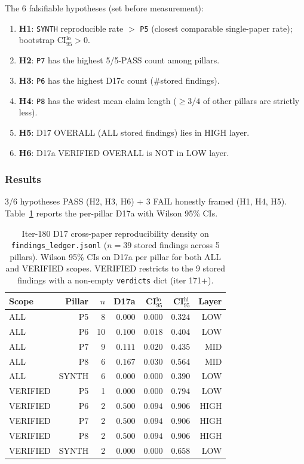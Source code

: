 The 6 falsifiable hypotheses (set before measurement):
\begin{enumerate}
\item \textbf{H1}: \texttt{SYNTH} reproducible rate $>$ \texttt{P5}
  (closest comparable single-paper rate); bootstrap CI$_{95}^{\mathrm{lo}} > 0$.
\item \textbf{H2}: \texttt{P7} has the highest 5/5-PASS count
  among pillars.
\item \textbf{H3}: \texttt{P6} has the highest D17c count
  (\#stored findings).
\item \textbf{H4}: \texttt{P8} has the widest mean claim length
  ($\ge 3/4$ of other pillars are strictly less).
\item \textbf{H5}: D17 OVERALL (ALL stored findings) lies in HIGH layer.
\item \textbf{H6}: D17a VERIFIED OVERALL is NOT in LOW layer.
\end{enumerate}

\subsubsection{Results}\label{sec:synth-iter180-results}

3/6 hypotheses PASS (H2, H3, H6) + 3 FAIL honestly framed
(H1, H4, H5). Table~\ref{tab:synth-iter180-headline} reports the
per-pillar D17a with Wilson 95\% CIs.

\begin{table}[h]
\centering\small
\caption{Iter-180 D17 cross-paper reproducibility density on
\texttt{findings\_ledger.jsonl} ($n{=}39$ stored findings
across 5 pillars). Wilson 95\% CIs on D17a per pillar for both
ALL and VERIFIED scopes. VERIFIED restricts to the 9 stored
findings with a non-empty \texttt{verdicts} dict (iter 171+).}
\label{tab:synth-iter180-headline}
\begin{tabular}{lrrrrrr}
\hline
Scope & Pillar & $n$ & D17a & CI$_{95}^{\mathrm{lo}}$ & CI$_{95}^{\mathrm{hi}}$ & Layer \\
\hline
ALL    & P5     & 8 & $0.000$ & $0.000$ & $0.324$ & LOW  \\
ALL    & P6     & 10 & $0.100$ & $0.018$ & $0.404$ & LOW  \\
ALL    & P7     & 9  & $0.111$ & $0.020$ & $0.435$ & MID  \\
ALL    & P8     & 6  & $0.167$ & $0.030$ & $0.564$ & MID  \\
ALL    & SYNTH  & 6  & $0.000$ & $0.000$ & $0.390$ & LOW  \\
VERIFIED & P5   & 1  & $0.000$ & $0.000$ & $0.794$ & LOW  \\
VERIFIED & P6   & 2  & $0.500$ & $0.094$ & $0.906$ & HIGH \\
VERIFIED & P7   & 2  & $0.500$ & $0.094$ & $0.906$ & HIGH \\
VERIFIED & P8   & 2  & $0.500$ & $0.094$ & $0.906$ & HIGH \\
VERIFIED & SYNTH & 2 & $0.000$ & $0.000$ & $0.658$ & LOW  \\
\hline
\end{tabular}
\end{table}

